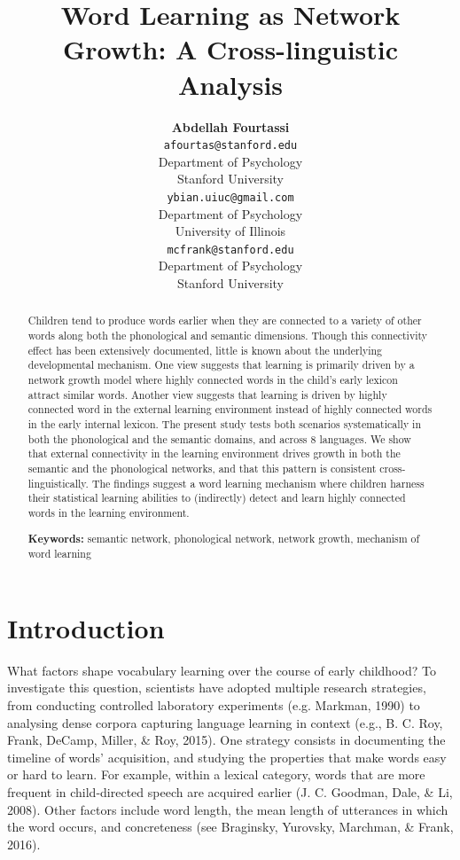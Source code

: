 \documentclass[10pt, letterpaper]{article}
\title{Word Learning as Network Growth: A Cross-linguistic Analysis}
\author{{\large \bf Abdellah Fourtassi} \\ \texttt{afourtas@stanford.edu} \\ Department of Psychology \\ Stanford University \And {\large \bf Yuan Bian} \\ \texttt{ybian.uiuc@gmail.com} \\ Department of Psychology \\ University of Illinois \And {\large \bf Michael C. Frank} \\ \texttt{mcfrank@stanford.edu} \\ Department of Psychology \\ Stanford University}
\begin{document}
\maketitle

\begin{abstract}
Children tend to produce words earlier when they are connected to a
variety of other words along both the phonological and semantic
dimensions. Though this connectivity effect has been extensively
documented, little is known about the underlying developmental
mechanism. One view suggests that learning is primarily driven by a
network growth model where highly connected words in the child's early
lexicon attract similar words. Another view suggests that learning is
driven by highly connected word in the external learning environment
instead of highly connected words in the early internal lexicon. The
present study tests both scenarios systematically in both the
phonological and the semantic domains, and across 8 languages. We show
that external connectivity in the learning environment drives growth in
both the semantic and the phonological networks, and that this pattern
is consistent cross-linguistically. The findings suggest a word learning
mechanism where children harness their statistical learning abilities to
(indirectly) detect and learn highly connected words in the learning
environment.

\textbf{Keywords:}
semantic network, phonological network, network growth, mechanism of
word learning
\end{abstract}

\section{Introduction}\label{introduction}

What factors shape vocabulary learning over the course of early
childhood? To investigate this question, scientists have adopted
multiple research strategies, from conducting controlled laboratory
experiments (e.g. Markman, 1990) to analysing dense corpora capturing
language learning in context (e.g., B. C. Roy, Frank, DeCamp, Miller, \&
Roy, 2015). One strategy consists in documenting the timeline of words'
acquisition, and studying the properties that make words easy or hard to
learn. For example, within a lexical category, words that are more
frequent in child-directed speech are acquired earlier (J. C. Goodman,
Dale, \& Li, 2008). Other factors include word length, the mean length
of utterances in which the word occurs, and concreteness (see Braginsky,
Yurovsky, Marchman, \& Frank, 2016).
\end{document}

